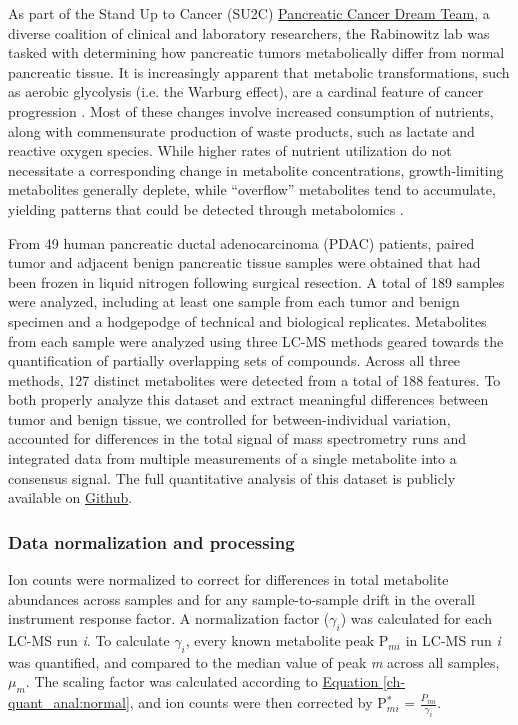 As part of the Stand Up to Cancer (SU2C) \href{http://www.standup2cancer.org/dream_team_members#Pancreatic}{Pancreatic Cancer Dream Team}, a diverse coalition of clinical and laboratory researchers, the Rabinowitz lab was tasked with determining how pancreatic tumors metabolically differ from normal pancreatic tissue.  It is increasingly apparent that metabolic transformations, such as aerobic glycolysis (i.e. the Warburg effect), are a cardinal feature of cancer progression \cite{VanderHeiden:2009gq, Hanahan:2011gu}.  Most of these changes involve increased consumption of nutrients, along with commensurate production of waste products, such as lactate and reactive oxygen species.  While higher rates of nutrient utilization do not necessitate a corresponding change in metabolite concentrations, growth-limiting metabolites generally deplete, while ``overflow'' metabolites tend to accumulate, yielding patterns that could be detected through metabolomics \cite{Boer:2010fb}.

From 49 human pancreatic ductal adenocarcinoma (PDAC) patients, paired tumor and adjacent benign pancreatic tissue samples were obtained that had been frozen in liquid nitrogen following surgical resection.  A total of 189 samples were analyzed, including at least one sample from each tumor and benign specimen and a hodgepodge of technical and biological replicates.  Metabolites from each sample were analyzed using three LC-MS methods geared towards the quantification of partially overlapping sets of compounds. Across all three methods, 127 distinct metabolites were detected from a total of 188 features.  To both properly analyze this dataset and extract meaningful differences between tumor and benign tissue, we controlled for between-individual variation, accounted for differences in the total signal of mass spectrometry runs and integrated data from multiple measurements of a single metabolite into a consensus signal. The full quantitative analysis of this dataset is publicly available on \href{https://github.com/shackett/Pancreatic_tumor_metabolomics}{Github}.

\subsubsection{Data normalization and processing}

Ion counts were normalized to correct for differences in total metabolite abundances across samples and for any sample-to-sample drift in the overall instrument response factor.  A normalization factor ($\gamma_{i}$) was calculated for each LC-MS run \textit{i}.  To calculate $\gamma_{i}$, every known metabolite peak P$_{mi}$ in LC-MS run \textit{i} was quantified, and compared to the median value of peak \textit{m} across all samples, $\mu_{m}$.  The scaling factor was calculated according to \hyperref[ch-quant_anal:normal]{Equation \ref{ch-quant_anal:normal}}, and ion counts were then corrected by P$^{*}_{mi}$ = $\frac{P_{mi}}{\gamma_{i}}$.


